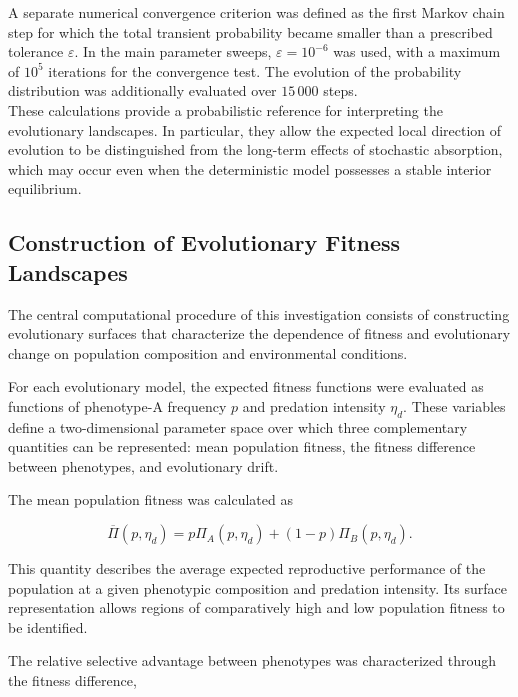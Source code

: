 A separate numerical convergence criterion was defined as the first Markov chain step for which the total transient probability became smaller than a prescribed tolerance \(\varepsilon\). In the main parameter sweeps, \(\varepsilon=10^{-6}\) was used, with a maximum of \(10^5\) iterations for the convergence test. The evolution of the probability distribution was additionally evaluated over \(15\,000\) steps. \\ 

These calculations provide a probabilistic reference for interpreting the evolutionary landscapes. In particular, they allow the expected local direction of evolution to be distinguished from the long-term effects of stochastic absorption, which may occur even when the deterministic model possesses a stable interior equilibrium.

\subsection{Construction of Evolutionary Fitness Landscapes}
\label{sec:fitness_methodology}

The central computational procedure of this investigation consists of constructing evolutionary surfaces that characterize the dependence of fitness and evolutionary change on population composition and environmental conditions.

For each evolutionary model, the expected fitness functions were evaluated as functions of phenotype-A frequency \(p\) and predation intensity \(\eta_d\). These variables define a two-dimensional parameter space over which three complementary quantities can be represented: mean population fitness, the fitness difference between phenotypes, and evolutionary drift.

The mean population fitness was calculated as

\begin{equation}
\overline{\Pi}(p,\eta_d)
=
p\Pi_A(p,\eta_d)
+
(1-p)\Pi_B(p,\eta_d).
\label{eq:method_fitness_landscape}
\end{equation}

This quantity describes the average expected reproductive performance of the population at a given phenotypic composition and predation intensity. Its surface representation allows regions of comparatively high and low population fitness to be identified.

The relative selective advantage between phenotypes was characterized through the fitness difference,

